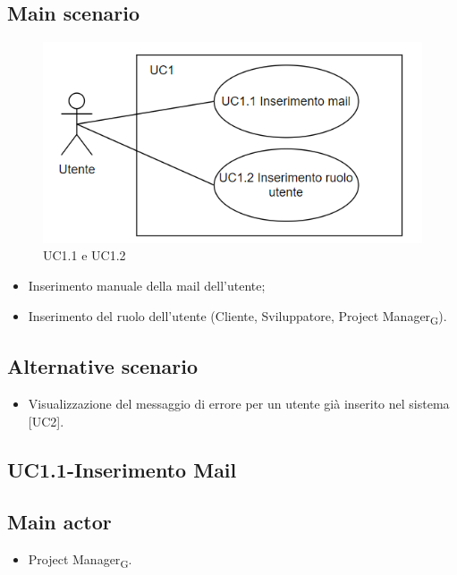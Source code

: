 \documentclass{article}
\begin{document}
    \subsection*{Main scenario}
   \begin{figure}[H]
      \centering
      \includegraphics{documenti/imgUML/UC1-SOTTOCASI.png}
      \caption{UC1.1 e UC1.2}
      \label{fig:UC1,1 e UC1.2}
    \end{figure} 
        \begin{itemize}
            \item Inserimento manuale della mail dell'utente;
            \item Inserimento del ruolo dell'utente (Cliente, Sviluppatore, Project Manager\textsubscript{G}).
        \end{itemize}
    \subsection*{Alternative scenario}
        \begin{itemize}
            \item Visualizzazione del messaggio di errore per un utente già inserito nel sistema [UC2].
        \end{itemize}

\subsection{UC1.1-Inserimento Mail}
    
     \subsection*{Main actor}
         \begin{itemize}
             \item Project Manager\textsubscript{G}.
         \end{itemize}
\end{document}
